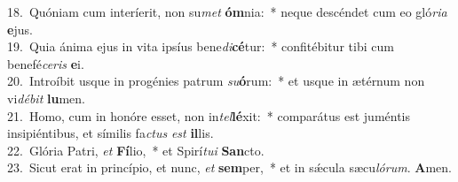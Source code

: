 {18.~}Quóniam cum interíerit, non su\textit{met} \textbf{óm}nia:~* neque descéndet cum eo gló\textit{ri}\textit{a} \textbf{e}jus.\\
{19.~}Quia ánima ejus in vita ipsíus bene\textit{di}\textbf{cé}tur:~* confitébitur tibi cum benefé\textit{ce}\textit{ris} \textbf{e}i.\\
{20.~}Introíbit usque in progénies patrum \textit{su}\textbf{ó}rum:~* et usque in ætérnum non vi\textit{dé}\textit{bit} \textbf{lu}men.\\
{21.~}Homo, cum in honóre esset, non in\textit{tel}\textbf{lé}xit:~* comparátus est juméntis insipiéntibus, et símilis fa\textit{ctus} \textit{est} \textbf{il}lis.\\
{22.~}Glória Patri, \textit{et} \textbf{Fí}lio,~* et Spirí\textit{tu}\textit{i} \textbf{San}cto.\\
{23.~}Sicut erat in princípio, et nunc, \textit{et} \textbf{sem}per,~* et in sǽcula sæcu\textit{ló}\textit{rum}. \textbf{A}men.\\
